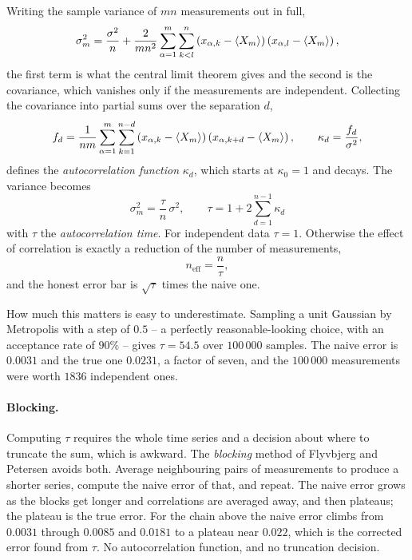 Writing the sample variance of $mn$ measurements out in full,
\begin{equation}
  \sigma_m^2 = \frac{\sigma^2}{n}
   + \frac{2}{mn^2}\sum_{\alpha=1}^{m}\sum_{k<l}^{n}
     \left(x_{\alpha,k}-\langle X_m \rangle\right)
     \left(x_{\alpha,l}-\langle X_m \rangle\right),
  \label{eq:12-variancesplit}
\end{equation}
the first term is what the central limit theorem gives and the second is the
covariance, which vanishes only if the measurements are independent.
Collecting the covariance into partial sums over the separation $d$,
\begin{equation}
  f_d = \frac{1}{nm}\sum_{\alpha=1}^{m}\sum_{k=1}^{n-d}
    \left(x_{\alpha,k}-\langle X_m \rangle\right)
    \left(x_{\alpha,k+d}-\langle X_m \rangle\right),
  \qquad
  \kappa_d = \frac{f_d}{\sigma^2},
  \label{eq:12-autocorrelation}
\end{equation}
defines the \emph{autocorrelation function} $\kappa_d$, which starts at
$\kappa_0=1$ and decays.  The variance becomes
\begin{equation}
  \boxed{\;
  \sigma_m^2 = \frac{\tau}{n}\,\sigma^2 ,
  \qquad
  \tau = 1 + 2\sum_{d=1}^{n-1}\kappa_d \;}
  \label{eq:12-tau}
\end{equation}
with $\tau$ the \emph{autocorrelation time}.  For independent data $\tau=1$.
Otherwise the effect of correlation is exactly a reduction of the number of
measurements,
\begin{equation}
  n_{\mathrm{eff}} = \frac{n}{\tau},
  \label{eq:12-neff}
\end{equation}
and the honest error bar is $\sqrt{\tau}$ times the naive one.

How much this matters is easy to underestimate.  Sampling a unit Gaussian by
Metropolis with a step of $0.5$ -- a perfectly reasonable-looking choice, with
an acceptance rate of $90\%$ -- gives $\tau=54.5$ over $100\,000$ samples.
The naive error is $0.0031$ and the true one $0.0231$, a factor of seven, and
the $100\,000$ measurements were worth $1836$ independent ones.

\paragraph{Blocking.}
Computing $\tau$ requires the whole time series and a decision about where to
truncate the sum, which is awkward.  The \emph{blocking} method of Flyvbjerg
and Petersen avoids both.  Average neighbouring pairs of measurements to
produce a shorter series, compute the naive error of that, and repeat.  The
naive error grows as the blocks get longer and correlations are averaged
away, and then plateaus; the plateau is the true error.  For the chain above
the naive error climbs from $0.0031$ through $0.0085$ and $0.0181$ to a
plateau near $0.022$, which is the corrected error found from $\tau$.  No
autocorrelation function, and no truncation decision.

